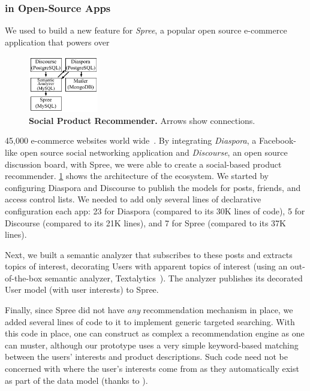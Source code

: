 \subsubsection{\synapse in Open-Source Apps}
\label{synapse:sec:apps:social}
\begingroup
\setlength{\columnsep}{6pt}
We used \synapse to build a new feature for \emph{Spree}, a popular open source
e-commerce application that powers over
\begin{figure}
\centering
   \includegraphics[width=1.2in]{figures/synapse/eco-social.pdf}
      \vspace{-6pt}
   \caption{\textbf{Social Product Recommender.} Arrows show \synapse
connections.}
   \label{synapse:fig:social-ecosystem}
\end{figure}
45,000 e-commerce websites world
wide~\cite{spree-site}.
By integrating \emph{Diaspora}, a Facebook-like open source social networking
application and \emph{Discourse}, an open source discussion board, with Spree,
we
were able to create a social-based product recommender.
\F\ref{synapse:fig:social-ecosystem} shows the architecture of the ecosystem.
We started by configuring Diaspora and Discourse to publish the models
for posts, friends, and access control lists.
We needed to add only several lines of declarative configuration each app: 23
for Diaspora (compared to its 30K lines of code), 5 for Discourse (compared to
its 21K lines), and 7 for Spree (compared to its 37K lines).

Next, we built a semantic analyzer that subscribes to these posts and extracts topics of interest, decorating Users with apparent topics of interest (using an out-of-the-box semantic analyzer, Textalytics~\cite{textalytics}).
The analyzer publishes its decorated {\code User} model (with user interests) to Spree.
\endgroup

Finally, since Spree did not have \emph{any} recommendation mechanism in place, we added several lines of code to it to implement generic targeted searching.
With this code in place, one can construct as complex a recommendation engine as
one can muster, although our prototype uses a very simple keyword-based matching
between the users' interests and product descriptions. Such code need not be
concerned with where the user's interests come from as they
automatically exist as part of the data model (thanks to \synapse).

